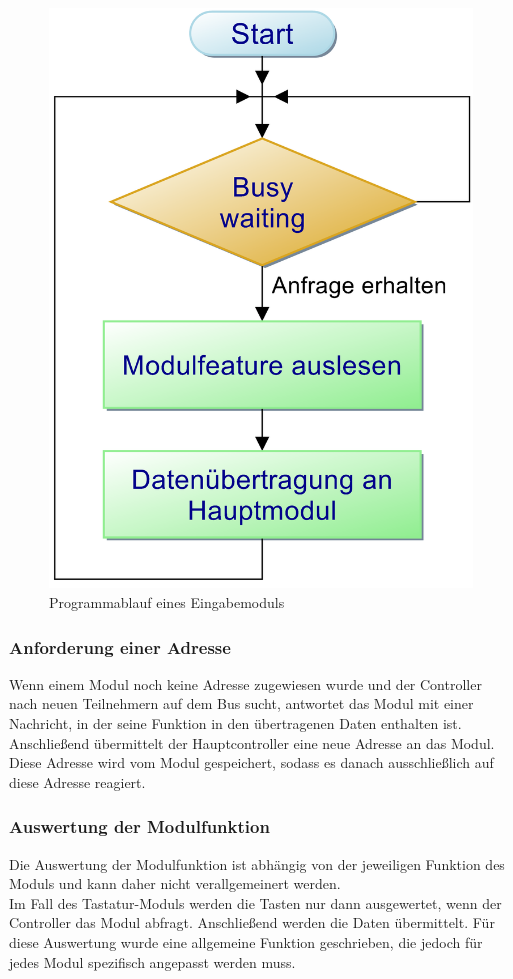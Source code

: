 \begin{figure}[H]
	\centering    
	\includegraphics[width=.75\textwidth]{Bilder/pap_eingabemodul.png}
	\caption{Programmablauf eines Eingabemoduls}
	\label{Programm_Eingabemodul}
\end{figure}

\subsubsection{Anforderung einer Adresse}
Wenn einem Modul noch keine Adresse zugewiesen wurde und der Controller nach neuen Teilnehmern auf dem Bus sucht, antwortet das Modul mit einer Nachricht, in der seine Funktion in den übertragenen Daten enthalten ist. Anschließend übermittelt der Hauptcontroller eine neue Adresse an das Modul. Diese Adresse wird vom Modul gespeichert, sodass es danach ausschließlich auf diese Adresse reagiert.\\




\subsubsection{Auswertung der Modulfunktion}
Die Auswertung der Modulfunktion ist abhängig von der jeweiligen Funktion des Moduls und kann daher nicht verallgemeinert werden.\\
Im Fall des Tastatur-Moduls werden die Tasten nur dann ausgewertet, wenn der Controller das Modul abfragt. Anschließend werden die Daten übermittelt. Für diese Auswertung wurde eine allgemeine Funktion geschrieben, die jedoch für jedes Modul spezifisch angepasst werden muss.\\

